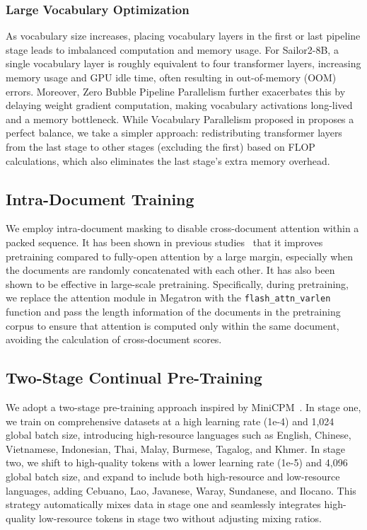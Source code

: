\subsubsection{Large Vocabulary Optimization}

As vocabulary size increases, placing vocabulary layers in the first or last pipeline stage leads to imbalanced computation and memory usage. 
For Sailor2-8B, a single vocabulary layer is roughly equivalent to four transformer layers, increasing memory usage and GPU idle time, often resulting in out-of-memory (OOM) errors.
Moreover, Zero Bubble Pipeline Parallelism \citep{qi2023zerobubble} further exacerbates this by delaying weight gradient computation, making vocabulary activations long-lived and a memory bottleneck. 
While Vocabulary Parallelism proposed in \cite{yeung2024vocab} proposes a perfect balance, we take a simpler approach: redistributing transformer layers from the last stage to other stages (excluding the first) based on FLOP calculations, which also eliminates the last stage’s extra memory overhead.


\subsection{Intra-Document Training}

We employ intra-document masking to disable cross-document attention within a packed sequence. It has been shown in previous studies~\citep{zhao-etal-2024-analysing, llama3} that it improves pretraining compared to fully-open attention by a large margin, especially when the documents are randomly concatenated with each other. 
It has also been shown to be effective in large-scale pretraining. Specifically, during pretraining, we replace the attention module in Megatron with the \texttt{flash\_attn\_varlen}
 function and pass the length information of the documents in the pretraining corpus to ensure that attention is computed only within the same document, avoiding the calculation of cross-document scores.



\subsection{Two-Stage Continual Pre-Training}

We adopt a two-stage pre-training approach inspired by MiniCPM~\citep{hu2024minicpm}. 
In stage one, we train on comprehensive datasets at a high learning rate (1e-4) and 1,024 global batch size, introducing high-resource languages such as English, Chinese, Vietnamese, Indonesian, Thai, Malay, Burmese, Tagalog, and Khmer. 
In stage two, we shift to high-quality tokens with a lower learning rate (1e-5)  and 4,096 global batch size, and expand to include both high-resource and low-resource languages, adding Cebuano, Lao, Javanese, Waray, Sundanese, and Ilocano. 
This strategy automatically mixes data in stage one and seamlessly integrates high-quality low-resource tokens in stage two without adjusting mixing ratios.

